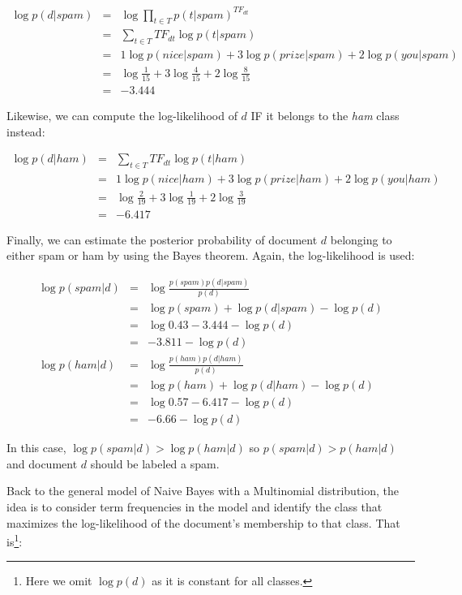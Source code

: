 \documentclass[
  letterpaper,
]{scrbook}
\begin{document}
\[\begin{aligned}
  \log p(d|spam)
  & = & \log \prod_{t \in T} p(t|spam)^{TF_{dt}} \\
  & = & \sum_{t \in T} TF_{dt}\log p(t|spam) \\
  & = & 1 \log p(nice|spam) + 3 \log p(prize|spam) + 2 \log p(you|spam) \\
  & = & \log \frac{1}{15} + 3 \log \frac{4}{15} + 2 \log \frac{8}{15} \\
  & = & - 3.444
\end{aligned}\]

Likewise, we can compute the log-likelihood of \(d\) IF it belongs to
the \emph{ham} class instead:

\[\begin{aligned}
  \log p(d|ham)
  & = & \sum_{t \in T} TF_{dt}\log p(t|ham) \\
  & = & 1 \log p(nice|ham) + 3 \log p(prize|ham) + 2 \log p(you|ham) \\
  & = & \log \frac{2}{19} + 3 \log \frac{1}{19} + 2 \log \frac{3}{19} \\
  & = & - 6.417
\end{aligned}\]

Finally, we can estimate the posterior probability of document \(d\)
belonging to either spam or ham by using the Bayes theorem. Again, the
log-likelihood is used:

\[\begin{aligned}
  \log p(spam|d)
  & = & \log \frac{p(spam)p(d|spam)}{p(d)} \\
  & = & \log p(spam) + \log p(d|spam) - \log p(d) \\
  & = & \log 0.43 - 3.444 - \log p(d) \\
  & = & - 3.811 - \log p(d) \\
  \log p(ham|d)
  & = & \log \frac{p(ham)p(d|ham)}{p(d)} \\
  & = & \log p(ham) + \log p(d|ham) - \log p(d) \\
  & = & \log 0.57 - 6.417 - \log p(d) \\
  & = & - 6.66 - \log p(d)
\end{aligned}\]

In this case, \(\log p(spam|d)> \log p(ham|d)\) so
\(p(spam|d)> p(ham|d)\) and document \(d\) should be labeled a spam.

Back to the general model of Naive Bayes with a Multinomial
distribution, the idea is to consider term frequencies in the model and
identify the class that maximizes the log-likelihood of the document's
membership to that class. That is\footnote{Here we omit \(\log p(d)\) as
  it is constant for all classes.}:
\end{document}
